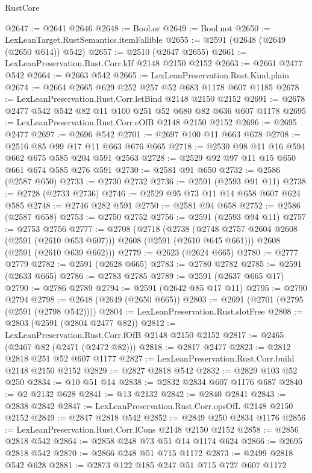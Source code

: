 \begin{lexlean}{RustCore}
\begin{coremodule}
@2647 := @2641 @2646
@2648 := Bool.or
@2649 := Bool.not
@2650 := LexLeanTarget.RustSemantics.itemFallible
@2655 := @2591 (@2648 (@2649 (@2650 @614)) @542)
@2657 := @2510 (@2647 @2655)
@2661 := LexLeanPreservation.Rust.Corr.kIf @2148 @2150 @2152
@2663 := @2661 @2477 @542
@2664 := @2663 @542
@2665 := LexLeanPreservation.Rust.Kind.plain
@2674 := @2664 @2665 @629 @252 @257 @52 @683 @1178 @607 @1185
@2678 := LexLeanPreservation.Rust.Corr.letBind @2148 @2150 @2152
@2691 := @2678 @2477 @542 @542 @82 @11 @100 @251 @52 @680 @82 @636 @607 @1178
@2695 := LexLeanPreservation.Rust.Corr.eOfB @2148 @2150 @2152
@2696 := @2695 @2477
@2697 := @2696 @542
@2701 := @2697 @100 @11 @663 @678
@2708 := @2516 @85 @99 @17 @11 @663 @676 @665
@2718 := @2530 @98 @11 @16 @594 @662 @675 @585 @204 @591 @2563
@2728 := @2529 @92 @97 @11 @15 @650 @661 @674 @585 @276 @591
@2730 := @2581 @91 @650
@2732 := @2586 (@2587 @650)
@2733 := @2730 @2732
@2736 := @2591 (@2593 @91 @11)
@2738 := @2728 (@2733 @2736)
@2746 := @2529 @95 @73 @11 @14 @658 @607 @624 @585
@2748 := @2746 @282 @591
@2750 := @2581 @94 @658
@2752 := @2586 (@2587 @658)
@2753 := @2750 @2752
@2756 := @2591 (@2593 @94 @11)
@2757 := @2753 @2756
@2777 := @2708
    (@2718
      (@2738 (@2748 @2757 @2604 @2608 (@2591 (@2610 @653 @607))) @2608 (@2591 (@2610 @645 @661)))
      @2608
      (@2591 (@2610 @639 @662)))
@2779 := @2623 (@2624 @665)
@2780 := @2777 @2779
@2782 := @2591 (@2628 @665)
@2783 := @2780 @2782
@2785 := @2591 (@2633 @665)
@2786 := @2783 @2785
@2789 := @2591 (@2637 @665 @17)
@2790 := @2786 @2789
@2794 := @2591 (@2642 @85 @17 @11)
@2795 := @2790 @2794
@2798 := @2648 (@2649 (@2650 @665))
@2803 := @2691 (@2701 (@2795 (@2591 (@2798 @542))))
@2804 := LexLeanPreservation.Rust.slotFree
@2808 := @2803 (@2591 (@2804 @2477 @82))
@2812 := LexLeanPreservation.Rust.Corr.fOfB @2148 @2150 @2152
@2817 := @2465 (@2467 @82 (@2471 (@2472 @82)))
@2818 := @2817 @2477
@2823 := @2812 @2818 @251 @52 @607 @1177
@2827 := LexLeanPreservation.Rust.Corr.build @2148 @2150 @2152
@2829 := @2827 @2818 @542
@2832 := @2829 @103 @52 @250
@2834 := @10 @51 @14
@2838 := @2832 @2834 @607 @1176 @687
@2840 := @2 @2132 @628
@2841 := @13 @2132
@2842 := @2840 @2841
@2843 := @2838 @2842
@2847 := LexLeanPreservation.Rust.Corr.opsOfL @2148 @2150 @2152
@2849 := @2847 @2818 @542
@2852 := @2849 @250 @2834 @1176
@2856 := LexLeanPreservation.Rust.Corr.lCons @2148 @2150 @2152
@2858 := @2856 @2818 @542
@2864 := @2858 @248 @73 @51 @14 @1174 @624
@2866 := @2695 @2818 @542
@2870 := @2866 @248 @51 @715 @1172
@2873 := @2499 @2818 @542 @628
@2881 := @2873 @122 @185 @247 @51 @715 @727 @607 @1172

\end{coremodule}
\end{lexlean}
